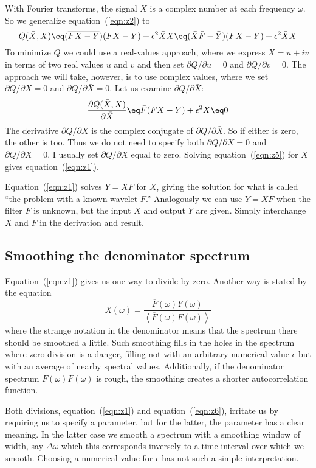 \par
With Fourier transforms,
the signal $X$ is a complex number at each frequency $\omega$.
So we generalize equation~(\ref{eqn:z2}) to
\begin{equation}
Q(\bar X, X) \eq
(\overline{FX-Y})        (FX-Y) + \epsilon^2 \bar X X \eq
(\bar X \bar F - \bar Y) (FX-Y) + \epsilon^2 \bar X X
\label{eqn:z4}
\end{equation}
To minimize $Q$ we could use a real-values approach,
where we express
$X=u+iv$ in terms of two real values $u$ and $v$
and then set $\partial Q/\partial u=0$ and $\partial Q/\partial v=0$.
The approach we will take, however,
is to use complex values,
where we set
$\partial Q/\partial X=0$ and $\partial Q/\partial \bar X=0$.
Let us examine $\partial Q/\partial \bar X$:
\begin{equation}
{\partial Q(\bar X, X)\over \partial  \bar X}  \eq
\bar F (FX-Y) + \epsilon^2  X  \eq 0
\label{eqn:z5}
\end{equation}
The derivative $\partial Q/\partial X$ is
the complex conjugate of $\partial Q/\partial \bar X$.
So if either is zero, the other is too.
Thus we do not need to specify both
$\partial Q/\partial X=0$ and $\partial Q/\partial \bar X=0$.
I usually set
$\partial Q/\partial \bar X$ equal to zero.
Solving equation~(\ref{eqn:z5}) for $X$
gives equation~(\ref{eqn:z1}).

\par
Equation~(\ref{eqn:z1}) solves $Y=XF$ for $X$,
giving the solution for what is called
``the  problem with a known wavelet $F$.''
Analogously we can use $Y=XF$ when the filter $F$ is unknown,
but the input $X$ and output $Y$ are given.
Simply interchange $X$ and $F$ in the derivation and result.

\subsection{Smoothing the denominator spectrum}

\par
Equation~(\ref{eqn:z1}) gives us one way to divide by zero.
Another way is stated by the equation
\begin{equation}
X(\omega) = \frac{ \overline{F}(\omega) Y(\omega) }
{\left<
\overline{F}(\omega)  F(\omega)
\right> }
\label{eqn:z6}
\end{equation}
where the strange notation in the denominator means
that the spectrum there should be smoothed a little.
Such smoothing fills in the holes in the spectrum
where zero-division is a danger,
filling not with an arbitrary numerical value $\epsilon$
but with an average of nearby spectral values.
Additionally, if the denominator spectrum
$\overline{F}(\omega) F(\omega)$ is rough,
the smoothing creates a shorter autocorrelation function.
\par
Both divisions,
equation~(\ref{eqn:z1}) and
equation~(\ref{eqn:z6}),
irritate us by requiring us to specify a parameter,
but for the latter, the parameter has a clear meaning.
In the latter case we smooth a spectrum with a smoothing
window of width, say $\Delta\omega$
which this corresponds inversely to a time interval over which we smooth.
Choosing a numerical value for  $\epsilon$ has not such a simple interpretation.

